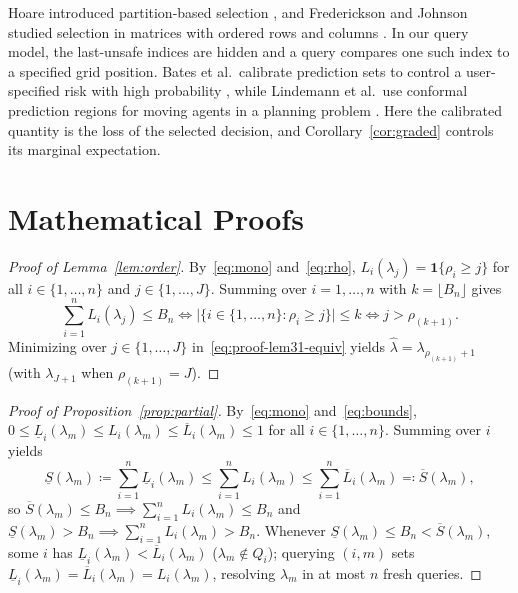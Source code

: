 \documentclass[a4paper,10pt]{article}
\theoremstyle{plain}
\theoremstyle{remark}
\begin{document}
Hoare introduced partition-based selection \cite{hoare}, and Frederickson and Johnson studied selection in matrices with ordered rows and columns \cite{fj}. In our query model, the last-unsafe indices are hidden and a query compares one such index to a specified grid position. Bates et al.\ calibrate prediction sets to control a user-specified risk with high probability \cite{rcps}, while Lindemann et al.\ use conformal prediction regions for moving agents in a planning problem \cite{lindemann}. Here the calibrated quantity is the loss of the selected decision, and Corollary~\ref{cor:graded} controls its marginal expectation.

\appendix
\section{Mathematical Proofs}\label{sec:proofs}

\begin{proof}[Proof of Lemma~\ref{lem:order}]
By~\eqref{eq:mono} and~\eqref{eq:rho}, $L_i(\lambda_j)=\mathbf1\{\rho_i\ge j\}$ for all $i\in\{1,\ldots,n\}$ and $j\in\{1,\ldots,J\}$. Summing over $i=1,\ldots,n$ with $k=\lfloor B_n\rfloor$ gives
\begin{equation}\label{eq:proof-lem31-equiv}
 \sum_{i=1}^n L_i(\lambda_j)\le B_n
 \iff \bigl|\{i\in\{1,\ldots,n\}:\rho_i\ge j\}\bigr|\le k
 \iff j>\rho_{(k+1)}.
\end{equation}
Minimizing over $j\in\{1,\ldots,J\}$ in~\eqref{eq:proof-lem31-equiv} yields $\widehat\lambda=\lambda_{\rho_{(k+1)}+1}$ (with $\lambda_{J+1}$ when $\rho_{(k+1)}=J$).
\end{proof}

\begin{proof}[Proof of Proposition~\ref{prop:partial}]
By~\eqref{eq:mono} and~\eqref{eq:bounds}, $0\le \underline L_i(\lambda_m)\le L_i(\lambda_m)\le \overline L_i(\lambda_m)\le 1$ for all $i\in\{1,\ldots,n\}$. Summing over $i$ yields
\begin{equation}\label{eq:proof-prop32-sum}
 \underline S(\lambda_m)\coloneqq\sum_{i=1}^n \underline L_i(\lambda_m)
 \le \sum_{i=1}^n L_i(\lambda_m)
 \le \sum_{i=1}^n \overline L_i(\lambda_m)\eqqcolon\overline S(\lambda_m),
\end{equation}
so $\overline S(\lambda_m)\le B_n \implies \sum_{i=1}^n L_i(\lambda_m)\le B_n$ and $\underline S(\lambda_m)>B_n \implies \sum_{i=1}^n L_i(\lambda_m)>B_n$. Whenever $\underline S(\lambda_m)\le B_n<\overline S(\lambda_m)$, some $i$ has $\underline L_i(\lambda_m)<\overline L_i(\lambda_m)$ ($\lambda_m\notin Q_i$); querying $(i,m)$ sets $\underline L_i(\lambda_m)=\overline L_i(\lambda_m)=L_i(\lambda_m)$, resolving $\lambda_m$ in at most $n$ fresh queries.
\end{proof}
\end{document}
